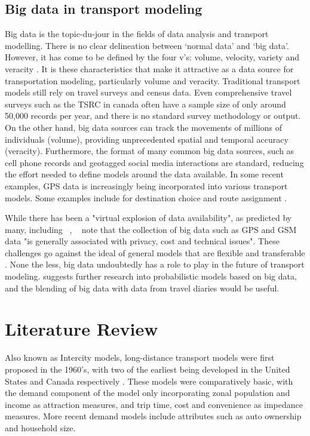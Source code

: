 \section{Big data in transport modeling}
Big data is the topic-du-jour in the fields of data analysis and transport modelling. There is no clear delineation between `normal data' and `big data'. However, it has come to be defined by the four v's: volume, velocity, variety and veracity \parencite{beyer2012importance}. It is these characteristics that make it attractive as a data source for transportation modeling, particularly volume and veracity. Traditional transport models still rely on travel surveys and census data. Even comprehensive travel surveys such as the TSRC in canada  often have a sample size of only around 50,000 records per year, and there is no standard survey methodology or output. On the other hand, big data sources can track the movements of millions of individuals (volume), providing unprecedented spatial and temporal accuracy (veracity). Furthermore, the format of many common big data sources, such as cell phone records and geotagged social media interactions are standard, reducing the effort needed to define models around the data available. In some recent examples, GPS data is increasingly being incorporated into various transport models. Some examples include for destination choice \parencite{schonfelder2006analysis, pan2006cellular} and route assignment \parencite{broach2012cyclists, menghini2010route}.

While there has been a "virtual explosion of data availability", as predicted by many, including ~\textcite{nagel2001workshop},  ~\textcite{horni2012improve} note that  the collection of big data such as GPS and GSM data "is generally associated with privacy, cost and technical issues".  These challenges go against the ideal of general models that are flexible and transferable \parencite{patriksson2015traffic}. None the less, big data undoubtedly has a role to play in the future of transport modeling. \textcite{rth2015} suggests further research into probabilistic models based on big data, and the blending of big data with data from travel diaries would be useful. 



\chapter{Literature Review}
\label{section:lit-review}
Also known as Intercity models, long-distance transport models were first proposed in the 1960’s, with two of the earliest being developed in the United States and Canada respectively \parencite{CTC71}. These models were comparatively basic, with the demand component of the model only incorporating zonal population and income as attraction measures, and trip time, cost and convenience as impedance measures. More recent demand models include attributes such as auto ownership and household size. 

